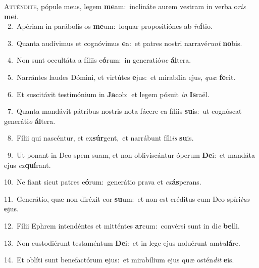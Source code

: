 \lettrine{\initial\textcolor{\initialcolor}{A}}{tténdite,} pópule meus, legem \textbf{me}\-am:~\star inclináte aurem vestram in verba o\textit{ris} \textbf{me}\-i.\\
{\numbfont\textcolor{\numbcolor}{~2.}}~Apériam in parábolis os \textbf{me}\-um:~\star loquar propositiónes ab \textit{in}\-\textbf{í}tio.\par
{\numbfont\textcolor{\numbcolor}{~3.}}~Quanta audívimus et cognóvimus \textbf{e}\-a:~\star et patres nostri narravé\textit{runt} \textbf{no}\-bis.\par
{\numbfont\textcolor{\numbcolor}{~4.}}~Non sunt occultáta a fíliis e\-\textbf{ó}\-rum:~\star in generatió\textit{ne} \textbf{ál}\-tera.\par
{\numbfont\textcolor{\numbcolor}{~5.}}~Narrántes laudes Dómini, et virtútes \textbf{e}\-jus:~\star et mirabília ejus, \textit{quæ} \textbf{fe}\-cit.\par
{\numbfont\textcolor{\numbcolor}{~6.}}~Et suscitávit testimónium in \textbf{Ja}\-cob:~\star et legem pósuit \textit{in} \textbf{Is}\-raël.\par
{\numbfont\textcolor{\numbcolor}{~7.}}~Quanta mandávit pátribus nostris nota fácere ea fíliis \textbf{su}\-is:~\star ut cognóscat generáti\textit{o} \textbf{ál}\-tera.\par
{\numbfont\textcolor{\numbcolor}{~8.}}~Fílii qui nascéntur, et ex\-\textbf{súr}\-gent,~\star et narrábunt fíli\textit{is} \textbf{su}\-is.\par
{\numbfont\textcolor{\numbcolor}{~9.}}~Ut ponant in Deo spem suam, et non obliviscántur óperum \textbf{De}\-i:~\star et mandáta ejus \textit{ex}\-\textbf{quí}rant.\par
{\numbfont\textcolor{\numbcolor}{10.}}~Ne fiant sicut patres e\-\textbf{ó}\-rum:~\star generátio prava et \textit{ex}\-\textbf{ás}perans.\par
{\numbfont\textcolor{\numbcolor}{11.}}~Generátio, quæ non diréxit cor \textbf{su}\-um:~\star et non est créditus cum Deo spíri\textit{tus} \textbf{e}\-jus.\par
{\numbfont\textcolor{\numbcolor}{12.}}~Fílii Ephrem intendéntes et mitténtes \textbf{ar}\-cum:~\star convérsi sunt in di\textit{e} \textbf{bel}\-li.\par
{\numbfont\textcolor{\numbcolor}{13.}}~Non custodiérunt testaméntum \textbf{De}\-i:~\star et in lege ejus noluérunt am\-\textit{bu}\-\textbf{lá}re.\par
{\numbfont\textcolor{\numbcolor}{14.}}~Et oblíti sunt benefactórum \textbf{e}\-jus:~\star et mirabílium ejus quæ ostén\textit{dit} \textbf{e}\-is.\par

